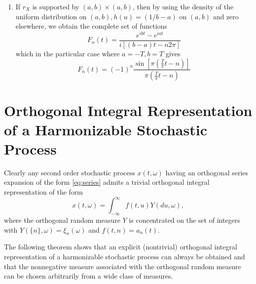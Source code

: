 \documentclass{article}
\begin{document}
\begin{enumerate}
  \item If $r_X$ is supported by $(a, b) \times (a, b)$, then by using the
  density of the uniform distribution on $(a, b), h (u) = (1 / b - a)$ on $(a,
  b)$ and zero elsewhere, we obtain the complete set of functions
  \begin{equation}
    F_n (t) = \frac{e^{ibt} - e^{iat}}{i [(b - a) t - n 2 \pi]}
    \label{eq:Fn-uniform}
  \end{equation}
  which in the particular case where $a = - T, b = T$ gives
  \begin{equation}
    F_n (t) = (- 1)^n \frac{\sin \left[ \pi \left( \frac{T}{\pi} t - n \right)
    \right]}{\pi \left( \frac{T}{\pi} t - n \right)}
    \label{eq:Fn-uniform-symm}
  \end{equation}
\end{enumerate}
\section{Orthogonal Integral Representation of a Harmonizable Stochastic
Process}\label{sec:orthogonal-integral}

Clearly any second order stochastic process $x (t, \omega)$ having an
orthogonal series expansion of the form \eqref{eq:series} admits a trivial
orthogonal integral representation of the form
\begin{equation}
  x (t, \omega) = \int_{- \infty}^{\infty} f (t, u) Y (du, \omega),
  \label{eq:integral-rep}
\end{equation}
where the orthogonal random measure $Y$ is concentrated on the set of integers
with $Y (\{n\}, \omega) = \xi_n (\omega)$ and $f (t, n) = a_n (t)$.

The following theorem shows that an explicit (nontrivial) orthogonal integral
representation of a harmonizable stochastic process can always be obtained and
that the nonnegative measure associated with the orthogonal random measure can
be chosen arbitrarily from a wide class of measures.
\end{document}
